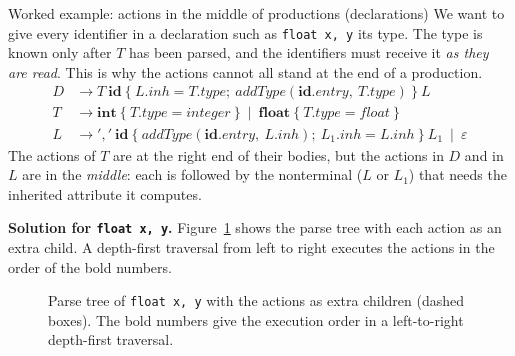 \documentclass[11pt,a4paper]{article}
\newcommand{\at}[2]{\ensuremath{#1.\mathit{#2}}}
\newcommand{\tok}[1]{\ensuremath{\mathtt{#1}}}
\begin{document}
\begin{examplebox}{Worked example: actions in the middle of productions (declarations)}
We want to give every identifier in a declaration such as \texttt{float x, y} its type. The type is known only after $T$ has been parsed, and the identifiers must receive it \emph{as they are read}. This is why the actions cannot all stand at the end of a production.
\begin{align*}
D &\to T\ \mathbf{id}\ \{\ \at{L}{inh}=\at{T}{type};\ \mathit{addType}(\at{\mathbf{id}}{entry},\ \at{T}{type})\ \}\ L\\
T &\to \mathbf{int}\ \{\ \at{T}{type}=integer\ \}\ \mid\ \mathbf{float}\ \{\ \at{T}{type}=float\ \}\\
L &\to \tok{','}\ \mathbf{id}\ \{\ \mathit{addType}(\at{\mathbf{id}}{entry},\ \at{L}{inh});\ \at{L_1}{inh}=\at{L}{inh}\ \}\ L_1\ \mid\ \varepsilon
\end{align*}
The actions of $T$ are at the right end of their bodies, but the actions in $D$ and in $L$ are in the \emph{middle}: each is followed by the nonterminal ($L$ or $L_1$) that needs the inherited attribute it computes.

\textbf{Solution for \texttt{float x, y}.} Figure~\ref{fig:midaction} shows the parse tree with each action as an extra child. A depth-first traversal from left to right executes the actions in the order of the bold numbers.

\begin{figure}[H]
\centering
{}
\caption{Parse tree of \texttt{float x, y} with the actions as extra children (dashed boxes). The bold numbers give the execution order in a left-to-right depth-first traversal.}
\label{fig:midaction}
\end{figure}


\end{examplebox}
\end{document}
